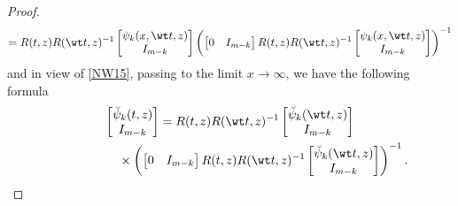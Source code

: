 \begin{proof}
\begin{gather*}
=
R(t,z)R(\wt t,z)^{-1}\begin{bmatrix}\psi_k(x, \wt t,z) \\ I_{m-k} \end{bmatrix} \left(
  \begin{bmatrix}0 &I_{m-k} \end{bmatrix}
 R(t,z)R(\wt t,z)^{-1}\begin{bmatrix}\psi_k(x, \wt t,z) \\ I_{m-k} \end{bmatrix} \right)^{-1}
\end{gather*}
and in view of \eqref{NW15}, passing to the limit $x \to \infty$, we have the following formula{\samepage
\begin{gather}\nonumber
\begin{bmatrix}\breve \psi_k( t,z) \\ I_{m-k} \end{bmatrix}
=
R(t,z)R(\wt t,z)^{-1}\begin{bmatrix}\breve \psi_k( \wt t,z) \\ I_{m-k} \end{bmatrix}
\\ \label{NW33}
\hphantom{\begin{bmatrix}\breve \psi_k( t,z) \\ I_{m-k} \end{bmatrix}
= }{}\times
 \left(
  \begin{bmatrix}0 &I_{m-k} \end{bmatrix}
 R(t,z)R(\wt t,z)^{-1}\begin{bmatrix}\breve \psi_k(\wt t,z) \\ I_{m-k} \end{bmatrix} \right)^{-1}.
\end{gather}}


\end{proof}
